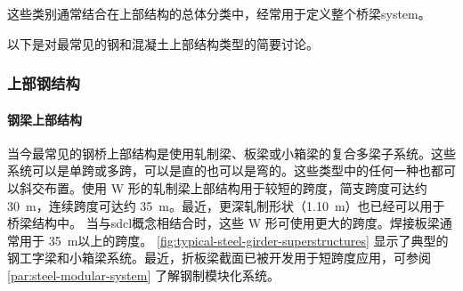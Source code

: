 这些类别通常结合在上部结构的总体分类中，经常用于定义整个桥梁\gls*{system}。

以下是对最常见的钢和混凝土上部结构类型的简要讨论。

\subsubsection{上部钢结构}
\paragraph{钢梁上部结构} 
当今最常见的钢桥上部结构是使用轧制梁、板梁或小箱梁的复合多梁子系统。这些系统可以是单跨或多跨，可以是直的也可以是弯的。这些类型中的任何一种也都可以斜交布置。使用 W 形的轧制梁上部结构用于较短的跨度，简支跨度可达约 \qty{30}{m}，连续跨度可达约 \qty{35}{m}。最近，更深轧制形状（\qty{1.10}{m}）也已经可以用于桥梁结构中。 当与\gls{sdcl}概念相结合时，这些 W 形可使用更大的跨度。焊接板梁通常用于 \qty{35}{m}以上的跨度\cite{nsba2008}。 \cref{fig:typical-steel-girder-superstructures} 显示了典型的钢工字梁和小箱梁系统。最近，折板梁截面已被开发用于短跨度应用，可参阅 \ref{par:steel-modular-system} 了解钢制模块化系统。

